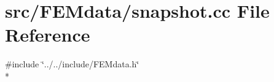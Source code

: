 \section{src/\-F\-E\-Mdata/snapshot.cc File Reference}
\label{snapshot_8cc}
{\ttfamily \#include \char`\"{}../../include/\-F\-E\-Mdata.\-h\char`\"{}}\\*
